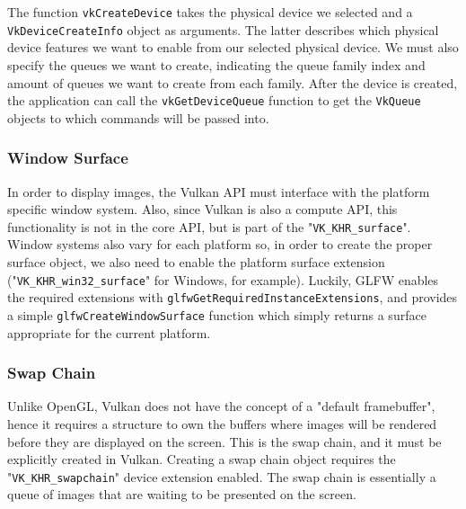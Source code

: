 The function \texttt{vkCreateDevice} takes the physical device we selected and a \texttt{VkDeviceCreateInfo} object as arguments. The latter describes which physical device features we want to enable from our selected physical device. We must also specify the queues we want to create, indicating the queue family index and amount of queues we want to create from each family. After the device is created, the application can call the \texttt{vkGetDeviceQueue} function to get the \texttt{VkQueue} objects to which commands will be passed into.

\subsubsection{Window Surface}
In order to display images, the Vulkan API must interface with the platform specific window system. Also, since Vulkan is also a compute API, this functionality is not in the core API, but is part of the "\texttt{VK\_KHR\_surface}". Window systems also vary for each platform so, in order to create the proper surface object, we also need to enable the platform surface extension ("\texttt{VK\_KHR\_win32\_surface}" for Windows, for example). Luckily, GLFW enables the required extensions with \texttt{glfwGetRequiredInstanceExtensions}, and provides a simple \texttt{glfwCreateWindowSurface} function which simply returns a surface appropriate for the current platform.

\subsubsection{Swap Chain}
Unlike OpenGL, Vulkan does not have the concept of a "default framebuffer", hence it requires a structure to own the buffers where images will be rendered before they are displayed on the screen. This is the swap chain, and it must be explicitly created in Vulkan. Creating a swap chain object requires the "\texttt{VK\_KHR\_swapchain}" device extension enabled. The swap chain is essentially a queue of images that are waiting to be presented on the screen.

